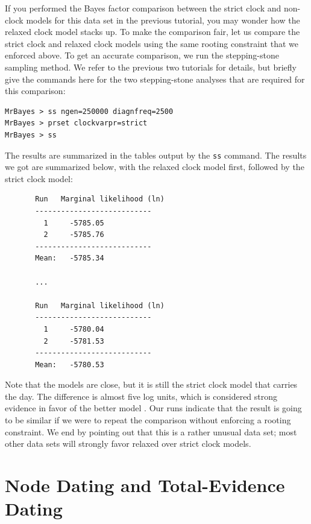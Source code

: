 \documentclass[12pt]{book}
\newcommand{\ttt}[1]{\texttt{#1}}
\begin{document}
If you performed the Bayes factor comparison between the strict clock and non-clock models for this
data set in the previous tutorial, you may wonder how the relaxed clock model stacks up. To make
the comparison fair, let us compare the strict clock and relaxed clock models using the same
rooting constraint that we enforced above. To get an accurate comparison, we run the stepping-stone
sampling method. We refer to the previous two tutorials for details, but briefly give the commands
here for the two stepping-stone analyses that are required for this comparison:

\begin{verbatim}
MrBayes > ss ngen=250000 diagnfreq=2500
MrBayes > prset clockvarpr=strict
MrBayes > ss
\end{verbatim}

The results are summarized in the tables output by the \ttt{ss} command. The results we got are
summarized below, with the relaxed clock model first, followed by the strict clock model:

\footnotesize
\begin{singlespacing}
\begin{verbatim}
       Run   Marginal likelihood (ln)
       ---------------------------
         1     -5785.05   
         2     -5785.76   
       ---------------------------
       Mean:   -5785.34
       
       ...
       
       Run   Marginal likelihood (ln)
       ---------------------------
         1     -5780.04   
         2     -5781.53   
       ---------------------------
       Mean:   -5780.53
\end{verbatim}
\end{singlespacing}
\normalsize

Note that the models are close, but it is still the strict clock model that carries the day. The
difference is almost five log units, which is considered strong evidence in favor of the better
model \cite{kass95}. Our runs indicate that the result is going to be similar if we were to repeat
the comparison without enforcing a rooting constraint. We end by pointing out that this is a rather
unusual data set; most other data sets will strongly favor relaxed over strict clock models.

\section{Node Dating and Total-Evidence Dating}
\end{document}
